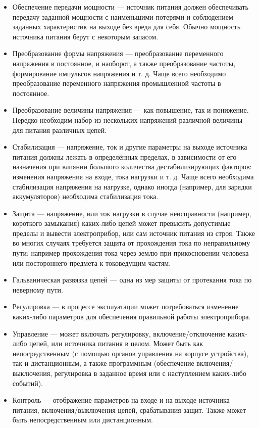 \begin{itemize}
\item Обеспечение передачи мощности --- источник питания должен обеспечивать передачу заданной мощности с наименьшими потерями и соблюдением заданных характеристик на выходе без вреда для себя. Обычно мощность источника питания берут с некоторым запасом.
\item Преобразование формы напряжения --- преобразование переменного напряжения в постоянное, и наоборот, а также преобразование частоты, формирование импульсов напряжения и т. д. Чаще всего необходимо преобразование переменного напряжения промышленной частоты в постоянное.
\item Преобразование величины напряжения --- как повышение, так и понижение. Нередко необходим набор из нескольких напряжений различной величины для питания различных цепей.
\item Стабилизация --- напряжение, ток и другие параметры на выходе источника питания должны лежать в определённых пределах, в зависимости от его назначения при влиянии большого количества дестабилизирующих факторов: изменения напряжения на входе, тока нагрузки и т. д. Чаще всего необходима стабилизация напряжения на нагрузке, однако иногда (например, для зарядки аккумуляторов) необходима стабилизация тока.
\item Защита --- напряжение, или ток нагрузки в случае неисправности (например, короткого замыкания) каких-либо цепей может превысить допустимые пределы и вывести электроприбор, или сам источник питания из строя. Также во многих случаях требуется защита от прохождения тока по неправильному пути: например прохождения тока через землю при прикосновении человека или постороннего предмета к токоведущим частям.
\item Гальваническая развязка цепей --- одна из мер защиты от протекания тока по неверному пути.
\item Регулировка --- в процессе эксплуатации может потребоваться изменение каких-либо параметров для обеспечения правильной работы электроприбора.
\item Управление --- может включать регулировку, включение/отключение каких-либо цепей, или источника питания в целом. Может быть как непосредственным (с помощью органов управления на корпусе устройства), так и дистанционным, а также программным (обеспечение включения/выключения, регулировка в заданное время или с наступлением каких-либо событий).
\item Контроль --- отображение параметров на входе и на выходе источника питания, включения/выключения цепей, срабатывания защит. Также может быть непосредственным или дистанционным.
\end{itemize}


